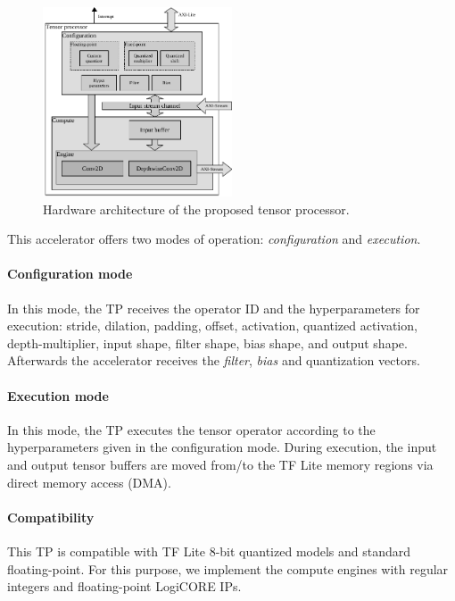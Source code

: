 \begin{figure}[t!]
	\centering
	\includegraphics[width=0.5\textwidth]{../figures/accelerator.pdf}
	\caption{Hardware architecture of the proposed tensor processor.}
	\label{fig:accelerator}
\end{figure}

This accelerator offers two modes of operation: \emph{configuration} and \emph{execution}.

\paragraph{Configuration mode}
In this mode, the TP receives the operator ID and the hyperparameters for execution: stride, dilation, padding, offset, activation, quantized activation, depth-multiplier, input shape, filter shape, bias shape, and output shape. Afterwards the accelerator receives the \emph{filter}, \emph{bias} and quantization vectors.

\paragraph{Execution mode}
In this mode, the TP executes the tensor operator according to the hyperparameters given in the configuration mode. During execution, the input and output tensor buffers are moved from/to the TF Lite memory regions via direct memory access (DMA).

\paragraph{Compatibility}

 This TP is compatible with TF Lite 8-bit quantized models and standard floating-point. For this purpose, we implement the compute engines with regular integers and floating-point LogiCORE IPs.
 
